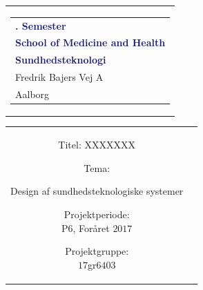 % 
\thispagestyle{empty}
\begin{nopagebreak}
	{\samepage 
		
		\begin{tabular}{r}
			\parbox{\textwidth}{  
				\hfill \hspace{2cm} \parbox{8cm}{\begin{tabular}{l} %
						{\small \textbf{\textcolor{MidnightBlue}{{$6$. Semester}}}}\\
						{\small \textbf{\textcolor{MidnightBlue}{School of Medicine and Health}}}\\
						{\small \textbf{\textcolor{MidnightBlue}{Sundhedsteknologi}}}\\
						{\small \textcolor{NavyBlue}{Fredrik Bajers Vej $7$A}} \\
						{\small \textcolor{NavyBlue}{$9220$ Aalborg}} \\
			\end{tabular}}}
		\end{tabular}
		
		\begin{tabular}{cc}
			\parbox{7cm}{
				\begin{description}

\item {Titel:}
XXXXXXX\\

\item {Tema:} 

\small{
Design af sundhedsteknologiske systemer
}

\end{description}

\parbox{8cm}{

\begin{description}
\item {Projektperiode:}\\
   P$6$, Foråret $2017$\\
   
\item {Projektgruppe:}\\
  $17$gr$6403$\\
  

\end{description}}}
\end{tabular}}
\end{nopagebreak}
